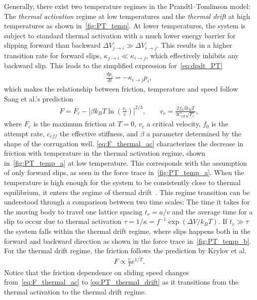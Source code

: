 Generally, there exist two temperature regimes in the Prandtl–Tomlinson model: The \textit{thermal activation} regime at low temperatures and the \textit{thermal drift} at high temperatures as shown in~\cref{fig:PT_temp}. At lower temperatures, the system is subject to standard thermal activation with a much lower energy barrier for slipping forward than backward $\Delta V_{j \to i} \gg \Delta V_{i \to j}$. This results in a higher transition rate for forward slips, $\kappa_{j \to i} \ll \kappa_{i \to j}$, which effectively inhibits any backward slip. This leads to the simplified expression for~\cref{eq:dpdt_PT}
\begin{align*}
  \frac{dp_i}{dt} = -\kappa_{i\to j}p_i,
\end{align*}
which makes the relationship between friction, temperature and speed follow Sang et al.’s prediction~\cite{Sang_2001}
\begin{align}
  F=F_c-\left|\beta k_B T \ln \left(\frac{v_c}{v}\right)\right|^{2 / 3}, \qquad v_c = \frac{2f_0\beta k_B T}{3 C_{\text{eff}} \sqrt{F_c}},
  \label{eq:F_thermal_ac}
\end{align}
where $F_c$ is the maximum friction at $T = 0$, $v_c$ a critical velocity, $f_0$
is the attempt rate, $c_{eff}$ the effective stiffness, and $\beta$ a
parameter determined by the shape of the corrugation well. \cref{eq:F_thermal_ac} characterizes the decrease in friction with temperature
in the thermal activation regime, shown in~\cref{fig:PT_temp_a} at low temperature. This corresponds with the assumption of only forward slips, as seen in the force trace in~\cref{fig:PT_temp_a}. When the temperature is high enough for the system to be consistently close to thermal equilibrium, it enters the regime of thermal drift~\cite{PhysRevE.71.065101}. This regime transition can be understood through a comparison between two time scales: The time it takes for the moving body to travel one lattice spacing
$t_v = a/v$ and the average time for a slip to occur due to thermal activation
$\tau = 1/\kappa = f^{-1}\exp(\Delta V / k_BT)$. If $t_v \gg \tau$ the system falls within the thermal drift regime, where slips happens both in the forward and backward direction as shown in the force trace in~\cref{fig:PT_temp_b}. For the thermal drift regime, the friction follows the prediction by Krylov et
al.~\cite{Krylow_2007, PhysRevE.71.065101, Jinesh_2008}
\begin{align}
  F \propto \frac{v}{T}e^{1/T}.
  \label{eq:PT_thermal_drift}
\end{align}
Notice that the friction dependence on sliding speed changes from~\cref{eq:F_thermal_ac} to \cref{eq:PT_thermal_drift} as it transitions from the thermal activation to the thermal drift regime. 


